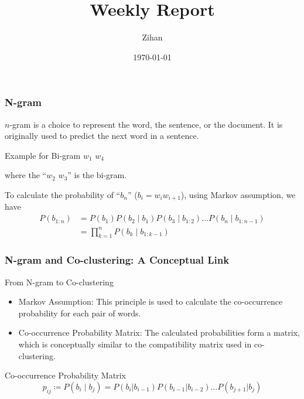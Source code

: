 \documentclass[11pt]{beamer}
\title{Weekly Report}
\author{Zihan}
\date{\today}
\begin{document}
\begin{frame}
    \frametitle{N-gram}

    $n$-gram is a choice to represent the word, the sentence, or the document. It is originally used to predict the next word in a sentence.

    \begin{block}{Example for Bi-gram}
        $w_1$  $w_4$

        where the ``$w_2$ $w_3$'' is the bi-gram.
    \end{block}

    To calculate the probability of ``$b_n$'' ($b_i = w_iw_{i+1}$), using Markov assumption, we have
    \begin{align*}
        P\left(b_{1: n}\right) & =P\left(b_1\right) P\left(b_2 \mid b_1\right) P\left(b_3 \mid b_{1: 2}\right) \ldots P\left(b_n \mid b_{1: n-1}\right) \\
                               & =\prod_{k=1}^n P\left(b_k \mid b_{1: k-1}\right)
    \end{align*}

\end{frame}



\begin{frame}
    \frametitle{N-gram and Co-clustering: A Conceptual Link}
    \begin{block}{From N-gram to Co-clustering}
        \begin{itemize}
            \item Markov Assumption: This principle is used to calculate the co-occurrence probability for each pair of words.
            \item Co-occurrence Probability Matrix: The calculated probabilities form a matrix, which is conceptually similar to the compatibility matrix used in co-clustering.
        \end{itemize}
    \end{block}
    \begin{block}{Co-occurrence Probability Matrix}
        \begin{equation*}
            p_{i j} \coloneqq P\left(b_i \mid b_j\right) = P\left(b_i | b_{i-1}\right) P\left(b_{i-1} | b_{i-2}\right) \ldots P\left(b_{j+1} | b_j\right)
        \end{equation*}
    \end{block}
\end{frame}    
\end{document}
